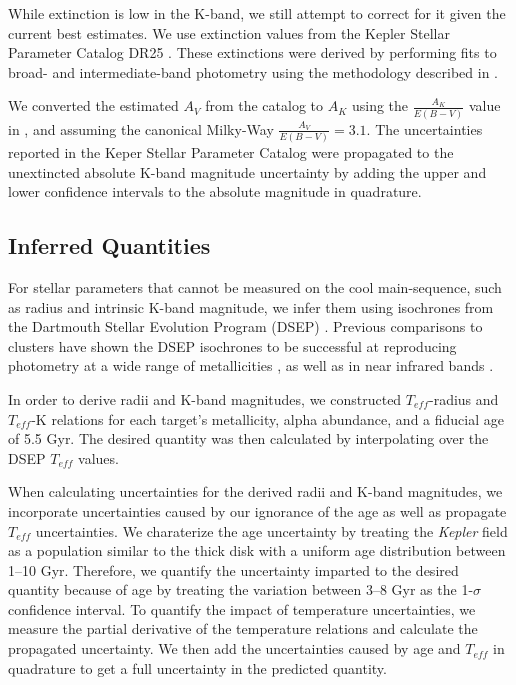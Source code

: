\documentclass[manuscript]{aastex6}
\newcommand{\Kepler}{\mbox{\textit{Kepler}}}
\newcommand{\Teff}{\ensuremath{T_{eff}}}
\begin{document}
While extinction is low in the K-band, we still attempt to correct for it given
the current best estimates. We use extinction values from the Kepler Stellar
Parameter Catalog DR25 \citep{Mathur17}. These extinctions were derived by
performing fits to broad- and intermediate-band photometry using the
methodology described in \citet{Huber14}.

We converted the estimated \(A_V\) from the catalog to \(A_K\) using the
\(\frac{A_K}{E(B-V)}\) value in \citet{Fitzpatrick09}, and assuming the
canonical Milky-Way \(\frac{A_V}{E(B-V)} = 3.1\). The uncertainties reported in
the Keper Stellar Parameter Catalog were propagated to the unextincted absolute
K-band magnitude uncertainty by adding the upper and lower confidence intervals
to the absolute magnitude in quadrature.

\subsection{Inferred Quantities}

For stellar parameters that cannot be measured on the cool main-sequence, such
as radius and intrinsic K-band magnitude, we infer them using isochrones from
the Dartmouth Stellar Evolution Program (DSEP) \citep{Dotter08}. Previous
comparisons to clusters have shown the DSEP isochrones to be successful at
reproducing photometry at a wide range of metallicities \citep{Dotter09}, as
well as in near infrared bands \citep{Sarajedini09}.

In order to derive radii and K-band magnitudes, we constructed \Teff-radius and
\Teff-K relations for each target's metallicity, alpha abundance, and a
fiducial age of 5.5 Gyr. The desired quantity was then calculated by
interpolating over the DSEP \Teff{} values.

When calculating uncertainties for the derived radii and K-band magnitudes, we
incorporate uncertainties caused by our ignorance of the age as well as
propagate \Teff{} uncertainties. We charaterize the age uncertainty by treating
the \Kepler{} field as a population similar to the thick disk with a uniform
age distribution between 1--10 Gyr. Therefore, we quantify the uncertainty
imparted to the desired quantity because of age by treating the variation
between 3--8 Gyr as the 1-\(\sigma\) confidence interval. To quantify the
impact of temperature uncertainties, we measure the partial derivative of the
temperature relations and calculate the propagated uncertainty. We then add the
uncertainties caused by age and \Teff{} in quadrature to get a full uncertainty
in the predicted quantity.
\end{document}
